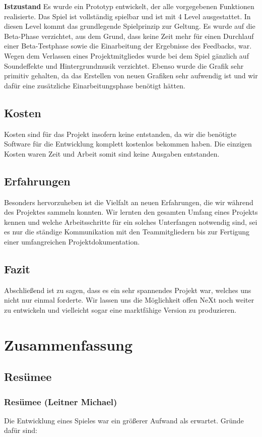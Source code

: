 \textbf{Istzustand}\newline
Es wurde ein Prototyp entwickelt, der alle vorgegebenen Funktionen realisierte. Das Spiel ist vollständig spielbar und ist mit 4 Level ausgestattet. In diesen Level kommt das grundlegende Spielprinzip zur Geltung. Es wurde auf die Beta-Phase verzichtet, aus dem Grund, dass keine Zeit mehr für einen Durchlauf einer Beta-Testphase sowie die Einarbeitung der Ergebnisse des Feedbacks, war. Wegen dem Verlassen eines Projektmitgliedes wurde bei dem Spiel gänzlich auf Soundeffekte und Hintergrundmusik verzichtet. Ebenso wurde die Grafik sehr primitiv gehalten, da das Erstellen von neuen Grafiken sehr aufwendig ist und wir dafür eine zusätzliche Einarbeitungsphase benötigt hätten.

\section{Kosten}
Kosten sind für das Projekt insofern keine entstanden, da wir die benötigte Software für die Entwicklung komplett kostenlos bekommen haben. Die einzigen Kosten waren Zeit und Arbeit somit sind keine Ausgaben entstanden.

\section{Erfahrungen}
Besonders hervorzuheben ist die Vielfalt an neuen Erfahrungen, die wir während des Projektes sammeln konnten. Wir lernten den gesamten Umfang eines Projekts kennen und welche Arbeitsschritte für ein solches Unterfangen notwendig sind, sei es nur die ständige Kommunikation mit den Teammitgliedern bis zur Fertigung einer umfangreichen Projektdokumentation.

\section{Fazit}
Abschließend ist zu sagen, dass es ein sehr spannendes Projekt war, welches uns nicht nur einmal forderte. Wir lassen uns die Möglichkeit offen NeXt noch weiter zu entwickeln und vielleicht sogar eine marktfähige Version zu produzieren.
\chapter{Zusammenfassung}
\section{Resümee}
\subsection{Resümee (Leitner Michael)}
Die Entwicklung eines Spieles war ein größerer Aufwand als erwartet.
Gründe dafür sind:

